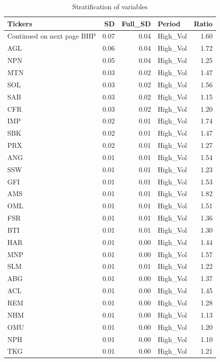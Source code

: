 \documentclass[11pt,preprint, authoryear]{elsarticle}
\numberwithin{equation}{section}
\numberwithin{figure}{section}
\numberwithin{table}{section}
\begin{document}
\begingroup\fontsize{12pt}{13pt}\selectfont
\begin{longtable}{lrrlr}
\caption{Stratification of variables} \\ 
  \toprule
Tickers & SD & Full\_SD & Period & Ratio \\ 
  \hline 
\endhead 
\hline 
{\footnotesize Continued on next page} 
\endfoot 
\endlastfoot 
 \midrule
BHP & 0.07 & 0.04 & High\_Vol & 1.60 \\ 
  AGL & 0.06 & 0.04 & High\_Vol & 1.72 \\ 
  NPN & 0.05 & 0.04 & High\_Vol & 1.25 \\ 
  MTN & 0.03 & 0.02 & High\_Vol & 1.47 \\ 
  SOL & 0.03 & 0.02 & High\_Vol & 1.56 \\ 
  SAB & 0.03 & 0.02 & High\_Vol & 1.15 \\ 
  CFR & 0.03 & 0.02 & High\_Vol & 1.20 \\ 
  IMP & 0.02 & 0.01 & High\_Vol & 1.74 \\ 
  SBK & 0.02 & 0.01 & High\_Vol & 1.47 \\ 
  PRX & 0.02 & 0.01 & High\_Vol & 1.27 \\ 
  ANG & 0.01 & 0.01 & High\_Vol & 1.54 \\ 
  SSW & 0.01 & 0.01 & High\_Vol & 1.23 \\ 
  GFI & 0.01 & 0.01 & High\_Vol & 1.53 \\ 
  AMS & 0.01 & 0.01 & High\_Vol & 1.82 \\ 
  OML & 0.01 & 0.01 & High\_Vol & 1.51 \\ 
  FSR & 0.01 & 0.01 & High\_Vol & 1.36 \\ 
  BTI & 0.01 & 0.01 & High\_Vol & 1.30 \\ 
  HAR & 0.01 & 0.00 & High\_Vol & 1.44 \\ 
  MNP & 0.01 & 0.00 & High\_Vol & 1.57 \\ 
  SLM & 0.01 & 0.01 & High\_Vol & 1.22 \\ 
  ABG & 0.01 & 0.00 & High\_Vol & 1.37 \\ 
  ACL & 0.01 & 0.00 & High\_Vol & 1.45 \\ 
  REM & 0.01 & 0.00 & High\_Vol & 1.28 \\ 
  NHM & 0.01 & 0.00 & High\_Vol & 1.13 \\ 
  OMU & 0.01 & 0.00 & High\_Vol & 1.20 \\ 
  NPH & 0.01 & 0.00 & High\_Vol & 1.10 \\ 
  TKG & 0.01 & 0.00 & High\_Vol & 1.21 \\ 

\end{longtable}
\end{document}
